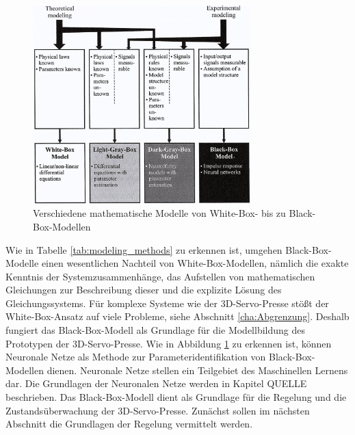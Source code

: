 \begin{figure} 
	\centering
	\includegraphics[width=0.75\textwidth]{images/modeling_methods}
	\caption{Verschiedene mathematische Modelle von White-Box- bis zu Black-Box-Modellen}
	\label{fig:modeling_methods}
\end{figure}

Wie in Tabelle \ref{tab:modeling_methods} zu erkennen ist, umgehen Black-Box-Modelle einen wesentlichen Nachteil von White-Box-Modellen, nämlich die exakte Kenntnis der Systemzusammenhänge, das Aufstellen von mathematischen Gleichungen zur Beschreibung dieser und die explizite Lösung des Gleichungssystems. Für komplexe Systeme  wie der 3D-Servo-Presse stößt der White-Box-Ansatz auf viele Probleme, siehe Abschnitt \ref{cha:Abgrenzung}. 
Deshalb fungiert das Black-Box-Modell als Grundlage für die Modellbildung des Prototypen der 3D-Servo-Presse.  Wie in Abbildung \ref{fig:modeling_methods} zu erkennen ist, können  Neuronale Netze als Methode zur Parameteridentifikation von Black-Box-Modellen dienen. Neuronale Netze stellen ein Teilgebiet des Maschinellen Lernens dar. Die Grundlagen der Neuronalen Netze werden in Kapitel QUELLE beschrieben. Das Black-Box-Modell dient als Grundlage für die Regelung und die Zustandsüberwachung der 3D-Servo-Presse. Zunächst sollen im nächsten Abschnitt die Grundlagen der Regelung vermittelt werden. 











